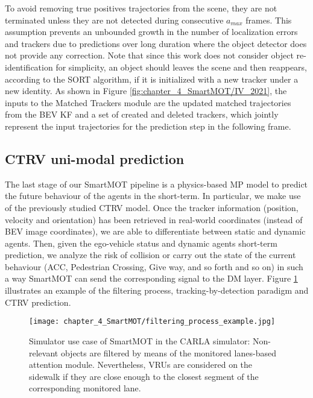 To avoid removing true positives trajectories from the scene, they are not terminated unless they are not detected during consecutive $a_{max}$ frames. This assumption prevents an unbounded growth in the number of localization errors and trackers due to predictions over long duration where the object detector does not provide any correction. Note that since this work does not consider object re-identification for simplicity, an object should leaves the scene and then reappears, according to the \ac{SORT} algorithm, if it is initialized with a new tracker under a new identity. As shown in Figure \ref{fig:chapter_4_SmartMOT/IV_2021}, the inputs to the Matched Trackers module are the updated matched trajectories from the \ac{BEV} \ac{KF} and a set of created and deleted trackers, which jointly represent the input trajectories for the prediction step in the following frame.

\subsection{CTRV uni-modal prediction}
\label{subsec:4_smartmot_ctrv_prediction}

The last stage of our SmartMOT pipeline is a physics-based \ac{MP} model to predict the future behaviour of the agents in the short-term. In particular, we make use of the previously studied \ac{CTRV} model. Once the tracker information (position, velocity and orientation) has been retrieved in real-world coordinates (instead of \ac{BEV} image coordinates), we are able to differentiate between static and dynamic agents. Then, given the ego-vehicle status and dynamic agents short-term prediction, we analyze the risk of collision or carry out the state of the current behaviour (\ac{ACC}, Pedestrian Crossing, Give way, and so forth and so on) in such a way SmartMOT can send the corresponding signal to the \ac{DM} layer. Figure \ref{fig:chapter_4_SmartMOT/filtering_process_example} illustrates an example of the filtering process, tracking-by-detection paradigm and \ac{CTRV} prediction.

\begin{figure}[] 
	\centering
	\texttt{[image: chapter\_4\_SmartMOT/filtering\_process\_example.jpg]}
	\captionsetup{justification=justified}
	\caption[Simulator use case of SmartMOT in the \ac{CARLA} simulator]{Simulator use case of SmartMOT in the \ac{CARLA} simulator: Non-relevant objects are filtered by means of the monitored lanes-based attention module. Nevertheless, \acfp{VRU} are considered on the sidewalk if they are close enough to the closest segment of the corresponding monitored lane.}
	\label{fig:chapter_4_SmartMOT/filtering_process_example}
\end{figure} 

